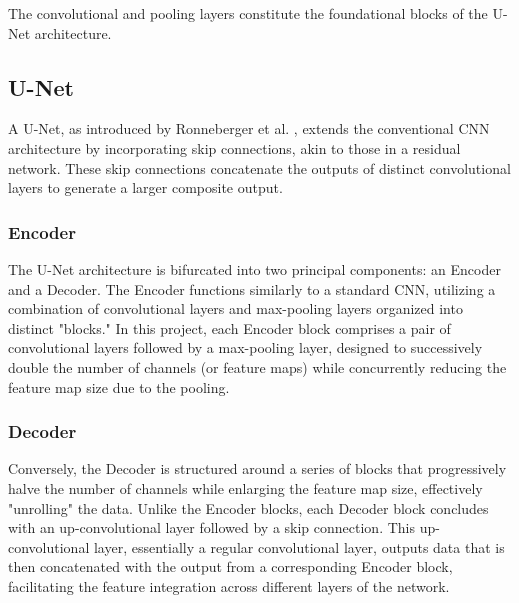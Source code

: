 \documentclass[12pt]{article}
\begin{document}
The convolutional and pooling layers constitute the foundational blocks of the U-Net architecture.

\subsection{U-Net}

A U-Net, as introduced by Ronneberger et al. \cite{ronneberger2015unet}, extends the conventional CNN architecture by incorporating skip connections, akin to those in a residual network. These skip connections concatenate the outputs of distinct convolutional layers to generate a larger composite output.

\subsubsection*{Encoder}

The U-Net architecture is bifurcated into two principal components: an Encoder and a Decoder. The Encoder functions similarly to a standard CNN, utilizing a combination of convolutional layers and max-pooling layers organized into distinct "blocks." In this project, each Encoder block comprises a pair of convolutional layers followed by a max-pooling layer, designed to successively double the number of channels (or feature maps) while concurrently reducing the feature map size due to the pooling.

\subsubsection*{Decoder}

Conversely, the Decoder is structured around a series of blocks that progressively halve the number of channels while enlarging the feature map size, effectively "unrolling" the data. Unlike the Encoder blocks, each Decoder block concludes with an up-convolutional layer followed by a skip connection. This up-convolutional layer, essentially a regular convolutional layer, outputs data that is then concatenated with the output from a corresponding Encoder block, facilitating the feature integration across different layers of the network.
\end{document}
